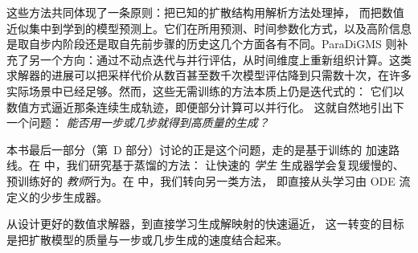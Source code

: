 这些方法共同体现了一条原则：把已知的扩散结构用解析方法处理掉，
而把数值近似集中到学到的模型预测上。它们在所用预测、时间参数化方式，以及高阶信息是取自步内阶段还是取自先前步骤的历史这几个方面各有不同。ParaDiGMS 则补充了另一个方向：通过不动点迭代与并行评估，从时间维度上重新组织计算。这类求解器的进展可以把采样代价从数百甚至数千次模型评估降到只需数十次，在许多实际场景中已经足够。然而，这些无需训练的方法本质上仍是迭代式的：
它们以数值方式逼近那条连续生成轨迹，即便部分计算可以并行化。
这就自然地引出下一个问题：
\emph{能否用一步或几步就得到高质量的生成？}

本书最后一部分（第~D 部分）讨论的正是这个问题，走的是基于训练的
加速路线。在  中，我们研究基于蒸馏的方法：
让快速的 \textit{学生} 生成器学会复现缓慢的、预训练好的
\textit{教师}行为。在  中，我们转向另一类方法，
即直接从头学习由 ODE 流定义的少步生成器。

从设计更好的数值求解器，到直接学习生成解映射的快速逼近，
这一转变的目标是把扩散模型的质量与一步或几步生成的速度结合起来。

